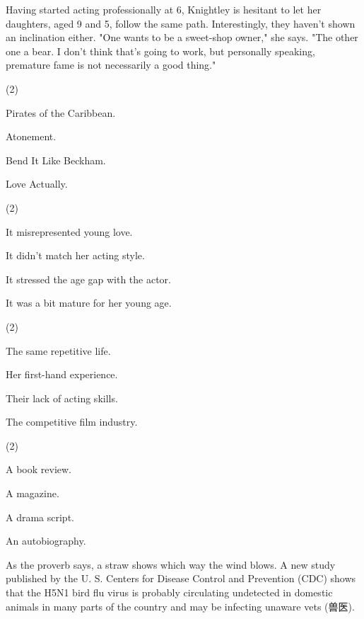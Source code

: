 \documentclass{英语试卷}
\begin{document}
\par Having started acting professionally at 6, Knightley is hesitant to let her daughters, aged 9 and 5, follow the same path. Interestingly, they haven't shown an inclination either. "One wants to be a sweet-shop owner," she says. "The other one a bear. I don't think that's going to work, but personally speaking, premature fame is not necessarily a good thing."\par
{}
\begin{choices}(2)
  \item Pirates of the Caribbean.
  \item Atonement.
  \item Bend It Like Beckham.
  \item Love Actually.
\end{choices}
\begin{choices}(2)
  \item It misrepresented young love.
  \item It didn't match her acting style.
  \item It stressed the age gap with the actor.
  \item It was a bit mature for her young age.
\end{choices}
\begin{choices}(2)
  \item The same repetitive life.
  \item Her first-hand experience.
  \item Their lack of acting skills.
  \item The competitive film industry.
\end{choices}
\begin{choices}(2)
  \item A book review.
  \item A magazine.
  \item A drama script.
  \item An autobiography.
\end{choices}
\par As the proverb says, a straw shows which way the wind blows. A new study published by the U. S. Centers for Disease Control and Prevention (CDC) shows that the H5N1 bird flu virus is probably circulating undetected in domestic animals in many parts of the country and may be infecting unaware vets (兽医).\par
\end{document}
